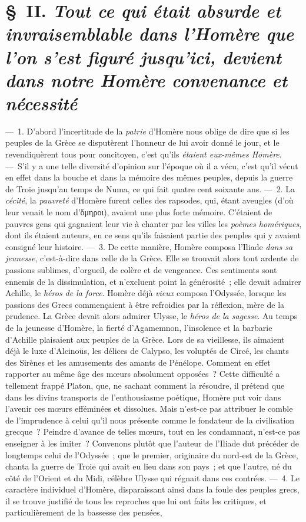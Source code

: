 \documentclass[french,twoside]{book} %
\begin{document}
\section[{§ II. Tout ce qui était absurde et invraisemblable dans l’Homère que l’on s’est figuré jusqu’ici, devient dans notre Homère convenance et nécessité}]{§ II. {\itshape Tout ce qui était absurde et invraisemblable dans l’Homère que l’on s’est figuré jusqu’ici, devient dans notre Homère convenance et nécessité}}
\noindent — 1. D’abord l’incertitude de la {\itshape patrie} d’Homère nous oblige de dire que si les peuples de la Grèce se disputèrent l’honneur de lui avoir donné le jour, et  le revendiquèrent tous pour concitoyen, c’est qu’ils {\itshape étaient eux-mêmes Homère}. — S’il y a une telle diversité d’opinion sur l’époque où il a vécu, c’est qu’il vécut en effet dans la bouche et dans la mémoire des mêmes peuples, depuis la guerre de Troie jusqu’au temps de Numa, ce qui fait quatre cent soixante ans. — 2. La {\itshape cécité}, la {\itshape pauvreté} d’Homère furent celles des rapsodes, qui, étant aveugles (d’où leur venait le nom d’ὅμηροι), avaient une plus forte mémoire. C’étaient de pauvres gens qui gagnaient leur vie à chanter par les villes les {\itshape poèmes homériques}, dont ils étaient auteurs, en ce sens qu’ils faisaient partie des peuples qui y avaient consigné leur histoire. — 3. De cette manière, Homère composa l’Iliade {\itshape dans sa jeunesse}, c’est-à-dire dans celle de la Grèce. Elle se trouvait alors tout ardente de passions sublimes, d’orgueil, de colère et de vengeance. Ces sentiments sont ennemis de la dissimulation, et n’excluent point la générosité ; elle devait admirer Achille, le {\itshape héros de la force}. Homère déjà {\itshape vieux} composa l’Odyssée, lorsque les passions des Grecs commençaient à être refroidies par la réflexion, mère de la prudence. La Grèce devait alors admirer Ulysse, le {\itshape héros de la sagesse}. Au temps de la jeunesse d’Homère, la fierté d’Agamemnon, l’insolence et la barbarie d’Achille plaisaient aux peuples de la Grèce. Lors de sa vieillesse, ils aimaient déjà le luxe d’Alcinoüs, les délices de Calypso, les voluptés de Circé, les chants des Sirènes et les amusements des amants de Pénélope. Comment en effet rapporter au même  âge des mœurs absolument opposées ? Cette difficulté a tellement frappé Platon, que, ne sachant comment la résoudre, il prétend que dans les divins transports de l’enthousiasme poétique, Homère put voir dans l’avenir ces mœurs efféminées et dissolues. Mais n’est-ce pas attribuer le comble de l’imprudence à celui qu’il nous présente comme le fondateur de la civilisation grecque ? Peindre d’avance de telles mœurs, tout en les condamnant, n’est-ce pas enseigner à les imiter ? Convenons plutôt que l’auteur de l’Iliade dut précéder de longtemps celui de l’Odyssée ; que le premier, originaire du nord-est de la Grèce, chanta la guerre de Troie qui avait eu lieu dans son pays ; et que l’autre, né du côté de l’Orient et du Midi, célèbre Ulysse qui régnait dans ces contrées. — 4. Le caractère individuel d’Homère, disparaissant ainsi dans la foule des peuples grecs, il se trouve justifié de tous les reproches que lui ont faits les critiques, et particulièrement de la bassesse des pensées, 
\end{document}
